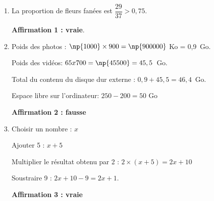 \documentclass[10pt]{article}
\begin{document}
\setlength\parindent{0mm}
\pagestyle{fancy}
\thispagestyle{empty}
    
    
    




\medskip

\begin{enumerate}
\item La proportion de fleurs fanées est $\dfrac{29}{37} > 0,75$. 

\textbf{Affirmation 1 : vraie}.
\item  Poids des photos : $\np{1000} \times 900 = \np{900000}$ Ko = 0,9~Go.

Poids des vidéos: $65 x 700 = \np{45500} = 45,5$~Go.

Total du contenu du disque dur externe : $0,9 + 45,5 = 46,4$~Go.

Espace libre sur l'ordinateur: $250 - 200 = 50$ Go

\textbf{Affirmation 2 : fausse}
\item  Choisir un nombre : $x$

Ajouter 5 : $x + 5$

Multiplier le résultat obtenu par 2 : $2 \times (x + 5) = 2x + 10$

Soustraire 9 : $2x + 10 - 9 = 2x + 1$.

\textbf{Affirmation 3 : vraie}
\end{enumerate}

\medskip


\vspace{0,5cm}
\end{document}
